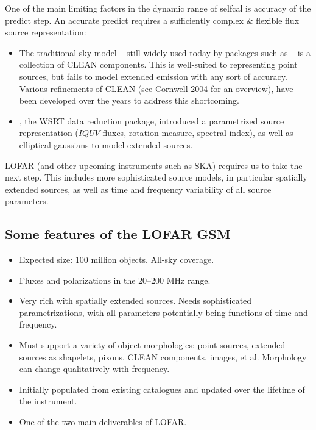 \documentclass[11pt,twoside]{article}  %
\begin{document}
One of the main limiting factors in the dynamic range of selfcal is accuracy of
the predict step. An accurate predict requires a sufficiently complex \&
flexible flux source representation:

\begin{itemize}

\item The traditional sky model -- still widely used today by packages such as
 -- is a collection of
CLEAN components. This is well-suited to representing point sources, but fails
to model extended emission with any sort of accuracy. Various refinements of
CLEAN (see Cornwell 2004 for an overview), have been developed over the years
to address this shortcoming.

\item {}, the WSRT data
reduction package, introduced a parametrized source representation ($IQUV$
fluxes, rotation measure, spectral index), as well as elliptical gaussians to
model extended sources.

\end{itemize}

LOFAR (and other upcoming instruments such as SKA) requires us to take the next
step. This includes more sophisticated source models, in particular spatially
extended sources, as well as time and frequency variability of all source
parameters. 

\subsection{Some features of the LOFAR GSM}

\begin{itemize}
\item Expected size: 100 million objects. All-sky coverage.
\item Fluxes and polarizations in the 20--200 MHz range.
\item Very rich with spatially extended sources. Needs sophisticated
parametrizations, with all parameters potentially being functions of time and
frequency.
\item Must support a variety of object morphologies: point sources, extended
sources as shapelets, pixons, CLEAN components, images, et al.  Morphology can
change qualitatively with frequency.
\item Initially populated from existing catalogues and updated over the lifetime
of the instrument.
\item One of the two main deliverables of LOFAR.
\end{itemize}
\end{document}
